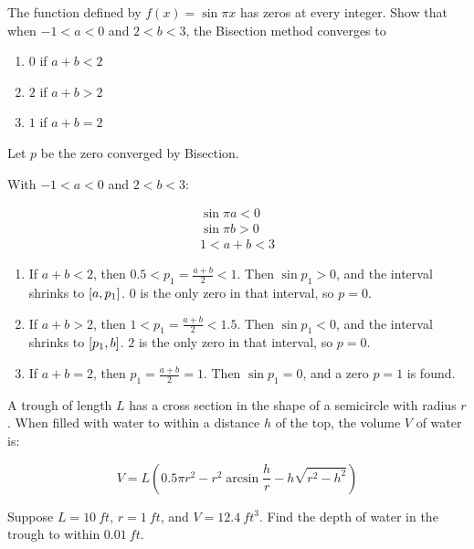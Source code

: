 \documentclass[../../../../Assignments.tex]{subfiles}
\begin{document}
\begin{exercise}
    The function defined by \(f(x) = \sin{\pi x}\) has zeros at every integer.
    Show that when \(−1 < a < 0\) and \(2 < b < 3\), the Bisection method
    converges to

    \begin{multicols}{3}
        \begin{enumerate}[label = (\alph*)]
            \item \(0\) if \(a + b < 2\)
            \item \(2\) if \(a + b > 2\)
            \item \(1\) if \(a + b = 2\)
        \end{enumerate}
    \end{multicols}
\end{exercise}

\begin{solution}
    Let \(p\) be the zero converged by Bisection.

    With \(-1 < a < 0\) and \(2 < b < 3\):

    \begin{gather*}
        \sin{\pi a} < 0 \\
        \sin{\pi b} > 0 \\
        1 < a + b < 3
    \end{gather*}

    \begin{enumerate}[label = (\alph*)]
        \item If \(a + b < 2\), then \(\num{0.5} < p_1 = \frac{a + b}{2} < 1\).
            Then \(\sin{p_1} > 0\), and the interval shrinks to
            \(\interval{a}{p_1}\). \(0\) is the only zero in that interval, so
            \(p = 0\).

        \item If \(a + b > 2\), then \(1 < p_1 = \frac{a + b}{2} < \num{1.5}\).
            Then \(\sin{p_1} < 0\), and the interval shrinks to
            \(\interval{p_1}{b}\). \(2\) is the only zero in that interval, so
            \(p = 0\).

        \item If \(a + b = 2\), then \(p_1 = \frac{a + b}{2} = 1\). Then
            \(\sin{p_1} = 0\), and a zero \(p = 1\) is found.
    \end{enumerate}
\end{solution}

\begin{exercise}
    A trough of length \(L\) has a cross section in the shape of a semicircle
    with radius \(r\). When filled with water to within a distance \(h\) of the
    top, the volume \(V\) of water is:

    \[V = L (\num{0.5} \pi r^2 - r^2 \arcsin{\frac{h}{r}} - h \sqrt{r^2 - h^2})\]

    Suppose \(L = \SI{10}{ft}\), \(r = \SI{1}{ft}\), and \(V =
    \SI{12.4}{ft^3}\). Find the depth of water in the trough to within
    \(\SI{0.01}{ft}\).
\end{exercise}
\end{document}
